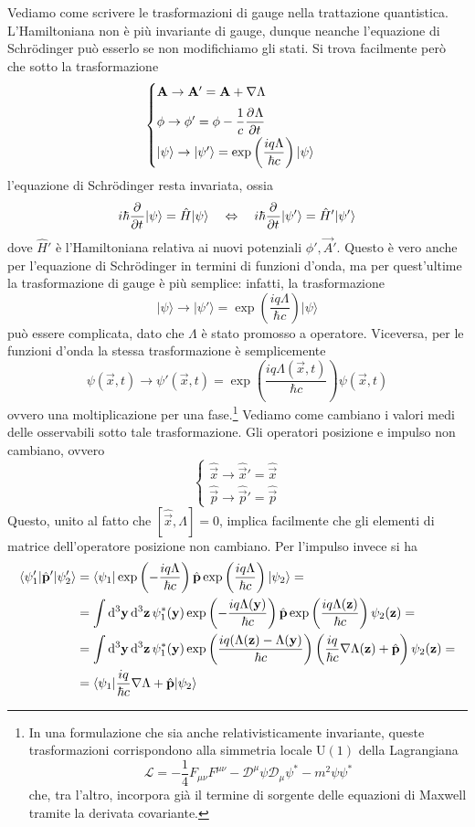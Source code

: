 \documentclass[a4paper, 11pt]{article}
\newcommand{\op}[1]{\hat{#1}}
\renewcommand{\op}[1]{\hat{#1}}
\newcommand{\ham}{\hat{H}}
\renewcommand{\ket}[1]{| #1\rangle}
\begin{document}
Vediamo come scrivere le trasformazioni di gauge nella trattazione quantistica. L'Hamiltoniana non è più invariante di gauge, dunque neanche l'equazione di Schr\"odinger può esserlo se non modifichiamo gli stati. Si trova facilmente però che sotto la trasformazione
\[\begin{cases}
\vec{A}\to\vec{A}'=\vec{A}+\nabla\Lambda\\[5pt]
\phi\to\phi'=\phi-\dfrac{1}{c}\pder{\Lambda}{t}\\[5pt]
\ket{\psi}\to\ket{\psi'}=\exp\left(\dfrac{iq\Lambda}{\hbar c}\right)\ket{\psi}
\end{cases}\]
l'equazione di Schr\"odinger resta invariata, ossia
\[i\hbar\pder{}{t}\ket{\psi}=\ham\ket{\psi}\quad\Leftrightarrow\quad i\hbar\pder{}{t}\ket{\psi'}=\ham'\ket{\psi'}\]
dove $\ham'$ è l'Hamiltoniana relativa ai nuovi potenziali $\phi',\vec{A}'$. Questo è vero anche per l'equazione di Schr\"odinger in termini di funzioni d'onda, ma per quest'ultime la trasformazione di gauge è più semplice: infatti, la trasformazione
\[\ket{\psi}\to\ket{\psi'}=\exp\left(\frac{iq\Lambda}{\hbar c}\right)\ket{\psi}\]
può essere complicata, dato che $\Lambda$ è stato promosso a operatore. Viceversa, per le funzioni d'onda la stessa trasformazione è semplicemente
\[\psi(\vec{x},t)\to\psi'(\vec{x},t)=\exp\left(\frac{iq\Lambda(\vec{x},t)}{\hbar c}\right)\psi(\vec{x},t)\]
ovvero una moltiplicazione per una fase.\footnote{In una formulazione che sia anche relativisticamente invariante, queste trasformazioni corrispondono alla simmetria locale $\mathrm{U}(1)$ della Lagrangiana
\[\mathcal{L}=-\frac{1}{4}F_{\mu\nu}F^{\mu\nu}-\mathcal{D}^\mu\psi\mathcal{D}_\mu\psi^*-m^2\psi\psi^*\]
che, tra l'altro, incorpora già il termine di sorgente delle equazioni di Maxwell tramite la derivata covariante.}
Vediamo come cambiano i valori medi delle osservabili sotto tale trasformazione. Gli operatori posizione e impulso non cambiano, ovvero
\[\begin{cases}
\op{\vec{x}}\to\op{\vec{x}}'=\op{\vec{x}}\\
\op{\vec{p}}\to\op{\vec{p}}'=\op{\vec{p}}
\end{cases}\]
Questo, unito al fatto che $[\op{\vec{x}},\Lambda]=0$, implica facilmente che gli elementi di matrice dell'operatore posizione non cambiano. Per l'impulso invece si ha
\begin{align*}
	\braketop{\psi_1'}{\op{\vec{p}}'}{\psi_2'}&=\braketop{\psi_1}{\exp\left(-\frac{iq\Lambda}{\hbar c}\right)\op{\vec{p}}\exp\left(\frac{iq\Lambda}{\hbar c}\right)}{\psi_2}=\\&=\int \d ^3\vec{y}\,\d ^3\vec{z}\,\psi_1^*(\vec{y})\exp\left(-\frac{iq\Lambda(\vec{y})}{\hbar c}\right)\op{\vec{p}}\exp\left(\frac{iq\Lambda(\vec{z})}{\hbar c}\right)\psi_2(\vec{z})=\\&=\int\d^3\vec{y}\,\d ^3\vec{z}\,\psi_1^*(\vec{y})\exp\left(\frac{iq(\Lambda(\vec{z})-\Lambda(\vec{y})}{\hbar c}\right)\left(\frac{iq}{\hbar c}\nabla\Lambda(\vec{z})+\op{\vec{p}}\right)\psi_2(\vec{z})=\\&=\braketop{\psi_1}{\frac{iq}{\hbar c}\nabla\Lambda+\op{\vec{p}}}{\psi_2}
\end{align*}
\end{document}
